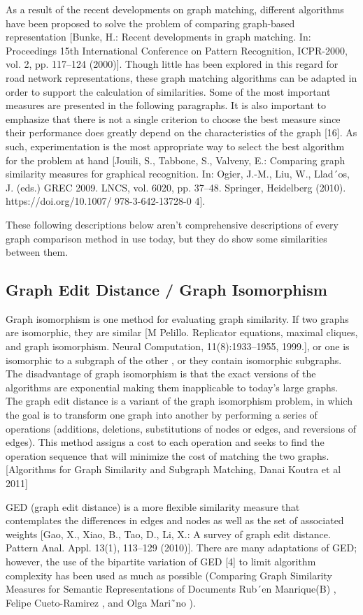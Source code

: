 As a result of the recent developments on graph matching, different algorithms have been proposed to solve the problem of comparing graph-based representation [Bunke, H.: Recent developments in graph matching. In: Proceedings 15th International Conference on Pattern Recognition, ICPR-2000, vol. 2, pp. 117–124 (2000)]. Though little has been explored in this regard for road network representations, these graph matching algorithms can be adapted in order to support the calculation of similarities. Some of the most important measures are presented in the following paragraphs. It is also important to emphasize that there is not a single criterion to choose the best measure since their performance does greatly depend on the characteristics of the graph [16]. As such, experimentation is the most appropriate way to select the best algorithm for the problem at hand [Jouili, S., Tabbone, S., Valveny, E.: Comparing graph similarity measures for graphical recognition. In: Ogier, J.-M., Liu, W., Llad´os, J. (eds.) GREC 2009. LNCS, vol. 6020, pp. 37–48. Springer, Heidelberg (2010). https://doi.org/10.1007/ 978-3-642-13728-0 4]. 

These following descriptions below aren't comprehensive descriptions of every graph comparison method in use today, but they do show some similarities between them.

\subsection{Graph Edit Distance / Graph Isomorphism}
Graph isomorphism is one method for evaluating graph similarity. If two graphs are isomorphic, they are similar [M Pelillo. Replicator equations, maximal cliques, and graph isomorphism. Neural Computation, 11(8):1933–1955, 1999.], or one is isomorphic to a subgraph of the other , or they contain isomorphic subgraphs. The disadvantage of graph isomorphism is that the exact versions of the algorithms are exponential making them inapplicable to today's large graphs.  The graph edit distance is a variant of the graph isomorphism problem, in which the goal is to transform one graph into another by performing a series of operations (additions, deletions, substitutions of nodes or edges, and reversions of edges). This method assigns a cost to each operation and seeks to find the operation sequence that will minimize the cost of matching the two graphs.[Algorithms for Graph Similarity and Subgraph Matching, Danai Koutra et  al 2011]

GED (graph edit distance) is a more flexible similarity measure that contemplates the differences in edges and nodes as well as the set of associated weights [Gao, X., Xiao, B., Tao, D., Li, X.: A survey of graph edit distance. Pattern Anal. Appl. 13(1), 113–129 (2010)]. There are many adaptations of GED; however, the use of the bipartite variation of GED [4] to limit algorithm complexity has been used as much as possible (Comparing Graph Similarity Measures for Semantic Representations of Documents Rub´en Manrique(B) , Felipe Cueto-Ramirez , and Olga Mari˜no ). 

